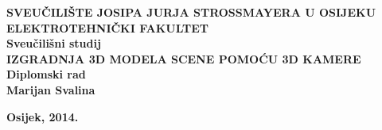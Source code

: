 \newpage
\begin{titlepage}
\begin{center}

\textbf{\MakeUppercase{\large 
    Sveučilište Josipa Jurja Strossmayera u Osijeku}}\\[0.2cm]

\textbf{\MakeUppercase{\large Elektrotehnički fakultet}}\\[0.8cm]
\textbf{\large Sveučilišni studij}\\ [5cm]

\textbf{\MakeUppercase{\Large 
    Izgradnja 3D modela scene pomoću 3D kamere }}\\ [1cm]

\textbf{\large Diplomski rad}\\  [5 cm] 

\textbf{\Large Marijan Svalina}\\ [0.5cm] 

\vfill

\textbf{\large Osijek, 2014.} \\

\end{center}
\end{titlepage}
